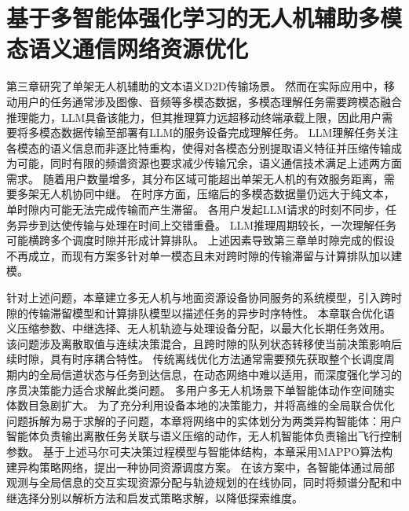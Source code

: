 \chapter{基于多智能体强化学习的无人机辅助多模态语义通信网络资源优化}

\label{chap:chapter4}

第三章研究了单架无人机辅助的文本语义D2D传输场景。
然而在实际应用中，移动用户的任务通常涉及图像、音频等多模态数据\supercite{Wang_2024_JEIT_Multimodal}，多模态理解任务需要跨模态融合推理能力，LLM具备该能力，但其推理算力远超移动终端承载上限，因此用户需要将多模态数据传输至部署有LLM的服务设备完成理解任务。
LLM理解任务关注各模态的语义信息而非逐比特重构，使得对各模态分别提取语义特征并压缩传输成为可能，同时有限的频谱资源也要求减少传输冗余，语义通信技术满足上述两方面需求。
随着用户数量增多，其分布区域可能超出单架无人机的有效服务距离，需要多架无人机协同中继\supercite{Liu_2023_TWC_Energy}。
在时序方面，压缩后的多模态数据量仍远大于纯文本，单时隙内可能无法完成传输而产生滞留。
各用户发起LLM请求的时刻不同步，任务异步到达使传输与处理在时间上交错重叠。
LLM推理周期较长，一次理解任务可能横跨多个调度时隙并形成计算排队。
上述因素导致第三章单时隙完成的假设不再成立，而现有方案多针对单一模态且未对跨时隙的传输滞留与计算排队加以建模\supercite{Liu_2024_TWC_Semantic,Hu_2025_TCOM_Resource}。

针对上述问题，本章建立多无人机与地面资源设备协同服务的系统模型，引入跨时隙的传输滞留模型和计算排队模型以描述任务的异步时序特性。
本章联合优化语义压缩参数、中继选择、无人机轨迹与处理设备分配，以最大化长期任务效用。
该问题涉及离散取值与连续决策混合，且跨时隙的队列状态转移使当前决策影响后续时隙，具有时序耦合特性。
传统离线优化方法通常需要预先获取整个长调度周期内的全局信道状态与任务到达信息，在动态网络中难以适用，而深度强化学习的序贯决策能力适合求解此类问题。
多用户多无人机场景下单智能体动作空间随实体数目急剧扩大\supercite{Zhao_2022_TWC_MultiAgent,Pei_2024_JEIT_Multitask}。
为了充分利用设备本地的决策能力，并将高维的全局联合优化问题拆解为易于求解的子问题，本章将网络中的实体划分为两类异构智能体：用户智能体负责输出离散任务关联与语义压缩的动作，无人机智能体负责输出飞行控制参数。
基于上述马尔可夫决策过程模型与智能体结构，本章采用MAPPO算法构建异构策略网络，提出一种协同资源调度方案。
在该方案中，各智能体通过局部观测与全局信息的交互实现资源分配与轨迹规划的在线协同，同时将频谱分配和中继选择分别以解析方法和启发式策略求解，以降低探索维度。


